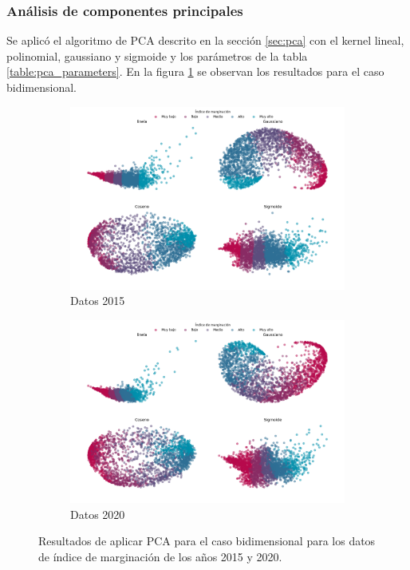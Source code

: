 \pagebreak
\subsubsection{Análisis de componentes principales}

Se aplicó el algoritmo de PCA descrito en la sección \ref{sec:pca} con el kernel lineal, polinomial, gaussiano y sigmoide y los parámetros de la tabla \ref{table:pca_parameters}. En la figura \ref{fig:PCA_2d} se observan los resultados para el caso bidimensional.

\begin{figure}[H]
	\centering
	\begin{subfigure}{8.4cm}
		\includegraphics[width=1\linewidth]{Graphics/Data_2015/PCA_2D.png}
		\caption{Datos 2015}
	\end{subfigure}
	\begin{subfigure}{8.4cm}
		\includegraphics[width=1\linewidth]{Graphics/Data_2020/PCA_2D.png}
		\caption{Datos 2020}
	\end{subfigure}
	\caption{Resultados de aplicar PCA para el caso bidimensional para los datos de índice de marginación de los años 2015 y 2020.}
	\label{fig:PCA_2d}
\end{figure}

